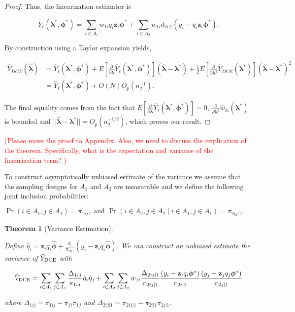 \documentclass[12pt]{article}
\newtheorem{theorem}{Theorem}
\renewcommand{\bf}[1]{\mathbf{#1}}
\begin{document}
\begin{proof}
  Thus, the linearization estimator is

  $$\hat Y_\ell(\bm \lambda^*, \bm \phi^*) = 
  \sum_{i \in A_1} w_{1i} q_i \bf z_i \bm \phi^* +
  \sum_{i \in A_2} w_{1i} d_{2i|1} (y_i - q_i \bf z_i \bm \phi^*).$$

  By construction using a Taylor expansion yields,

  \begin{align*}
    \hat Y_{DCE}(\hat{\bm \lambda}) 
    &= \hat Y_\ell(\bm \lambda^*, \bm \phi^*) + 
    E\left[\frac{\partial}{\partial \bm \lambda}\hat Y_\ell(\bm \lambda^*,
    \bm \phi^*)\right](\hat{\bm \lambda} - \bm \lambda^*) + \frac{1}{2}
    E\left[\frac{\partial}{\partial \bm \lambda^2} \hat Y_{DCE}(\bm \lambda^*)\right] 
    (\hat{\bm \lambda} - \bm \lambda^*)^2\\
    &= \hat Y_\ell(\bm \lambda^*, \bm \phi^*) + O(N)O_p(n_2^{-1}).
  \end{align*}

  The final equality comes from the fact that 
  $E\left[\frac{\partial}{\partial \bm \lambda}
  \hat Y_\ell(\bm \lambda^*, \bm \phi^*)\right] = 0$,
  $\frac{\partial}{\partial \bm \lambda^2} \hat w_{2i}(\bm \lambda^*)$ is
  bounded and $||\hat{\bm \lambda} - \bm \lambda^*|| = O_p(n_2^{-1/2})$, which
  proves our result.
\end{proof}

\textcolor{red}{(Please move the proof to Appendix. Also, we need to discuss the implication of the theorem. Specifically, what is the expectation and variance of the linearization term? ) }

To construct asymptotically unbiased estimate of the variance we assume that the
sampling designs for $A_1$ and $A_2$ are measurable and we define the following
joint inclusion probabilities:

$\Pr(i \in A_1, j \in A_1) = \pi_{1ij}, \text{ and }
\Pr(i \in A_2, j \in A_2 \mid i \in A_1, j \in A_1) = \pi_{2ij|1}.$

\begin{theorem}[Variance Estimation]\label{thm:mainvar}

  Define $\hat \eta_i = \bf z_i q_i \hat{\bm \phi} + 
  \frac{\delta_i}{\pi_{2i|1}}(y_i - \bf z_i q_i \hat{\bm \phi})$.
  We can construct an unbiased estimate the variance of $\hat Y_{\rm DCE}$ with

  $$
  \hat V_{\rm DCE} 
  = \sum_{i \in A_1} \sum_{j \in A_1} \frac{\Delta_{1ij}}{\pi_{1ij}} 
  \hat \eta_i \hat \eta_j
  + \sum_{i \in A_2} \sum_{j \in A_2} w_{1i} \frac{\Delta_{2ij|1}}{\pi_{2ij|1}} 
  \frac{(y_i - \bf z_i q_i \bm \phi^*)}{\pi_{2i|1}}
  \frac{(y_j - \bf z_j q_j \bm \phi^*)}{\pi_{2j|1}}
  $$

  where $\Delta_{1ij} = \pi_{1ij} - \pi_{1i}\pi_{1j}$ and 
  $\Delta_{2ij|1} = \pi_{2ij|1} - \pi_{2i|1}\pi_{2j|1}$.

\end{theorem}
\end{document}

